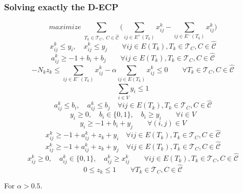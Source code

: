 \documentclass{beamer}
\begin{document}
\begin{frame}[c]
	\frametitle{Solving exactly the D-ECP}

	{\footnotesize
		\begin{equation}
			maximize \; \sum_{ T_{k} \in \mathcal{T}_{C}, \; C \in
				\mathcal{\hat{C}} } \big( \sum^{}_{ij \in E^{+} (T_{k})} x_{ij}
				^{k} - \sum_{ij \in E^{-} (T_{k})} x_{ij} ^{k} \big)
		\end{equation}
		\begin{equation}
			x _{ij}^{k}  \leq y_i, \quad x _{ij} ^{k} \leq y_j \quad\quad \forall ij \in E(T_{k}), T_{k} \in
			\mathcal{T}_{C}, C \in \mathcal{\hat{C}}
		\end{equation}
		\begin{equation}
			a _{ij} ^{k} \geq - 1 + b_i + b_j \quad\quad \forall ij \in E(T_k), T_k \in \mathcal{T} _{C}, C \in \hat{\mathcal{C} }
		\end{equation}
		\begin{equation}
			-N_{k} z_{k}  \leq \sum^{}_{ij \in E^{-} (T_k)} x_{ij}^{k}  - \alpha \sum^{}_{ij \in E(T_k)}
			x_{ij} ^{k}  \leq 0 \quad\quad \forall T_{k} \in \mathcal{T} _{C}, C \in
			\hat{\mathcal{C}}
		\end{equation}
		\begin{equation}
			\sum^{}_{i \in V} y_i \leq 1
		\end{equation}
		\begin{equation}
			a_{ij}^{k} \leq b_{i}, \quad a_{ij}^{k} \leq b_{j} \quad \forall ij \in E(T_{k}), T_{k} \in
			\mathcal{T}_{C}, C \in \mathcal{\hat{C}}
		\end{equation}
		\begin{equation}
			y _{i} \geq 0, \quad b _{i} \in \{0, 1\},
			\quad b_i \geq y_i\quad\quad \forall i \in V
		\end{equation}
		\begin{equation}
			y_i \geq -1 + b_i + y_j \quad\quad \forall (i, j) \in V
		\end{equation}
		\begin{equation}
			x_{ij}^{k} \geq -1 + a_{ij} ^{k} + z_{k} + y_i \quad \forall ij \in E(T_{k}),
			T_{k} \in \mathcal{T}_{C}, C \in \mathcal{\hat{C}}
		\end{equation}
		\begin{equation}
			x_{ij}^{k} \geq -1 + a_{ij} ^{k} + z_{k} + y_j \quad \forall ij \in E(T_{k}),
			T_{k} \in \mathcal{T}_{C}, C \in \mathcal{\hat{C}}
		\end{equation}
		\begin{equation}
			x _{ij} ^{k}  \geq 0, \quad a _{ij} ^{k}  \in \{0, 1\}, \quad a_{ij}
				^{k} \geq x_{ij} ^{k}  \quad\quad \forall ij \in E(T_{k}), T_{k} \in
			\mathcal{T}_{C}, C \in \mathcal{\hat{C}}
		\end{equation}
		\begin{equation}
			0 \leq z _{k} \leq 1 \quad\quad \forall T_{k} \in \mathcal{T} _{C}, C \in
			\hat{\mathcal{C}}
		\end{equation}

		For $\alpha > 0.5$.
	}
\end{frame}
\end{document}
